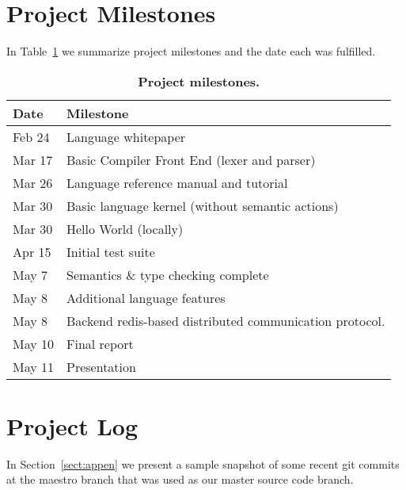 \section{Project Milestones}
In Table~\ref{tab:milestones}  we summarize project milestones and the date
each was fulfilled.

\begin{table}[!h]
{%
 \begin{center}
    \begin{tabular}{ | l || l |}
    \hline
    \textbf{Date} & \textbf{Milestone}\\
    \hline
    \hline
    Feb 24 &  Language whitepaper\\ \hline
    Mar 17 &  Basic Compiler Front End (lexer and parser)\\ \hline
    Mar 26 &  Language reference manual and tutorial\\ \hline
    Mar 30 &  Basic language kernel (without semantic actions)\\ \hline
    Mar 30 &  Hello World (locally)\\ \hline
    Apr 15 &  Initial test suite \\ \hline
    May 7 &  Semantics \& type checking complete \\ \hline
    May 8 &  Additional language features \\ \hline
    May 8 &  Backend redis-based distributed communication protocol.\\ \hline
    May 10 &  Final report\\ \hline
    May 11 &  Presentation\\ \hline
    \end{tabular}
    \caption{\textbf{Project milestones.}}
    \label{tab:milestones}
 \end{center}
}
\end{table}


\section{Project Log}
In Section~\ref{sect:appen} we present a sample snapshot of some recent git
commits at the maestro branch that was used as our master source code branch.
